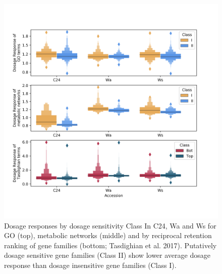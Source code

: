\documentclass[11pt]{article}
\begin{document}
\begin{figure}[h!]
    \includegraphics[width=\linewidth]{../figures/all_dr_boxen.png}
 \caption{Dosage responses by dosage sensitivity Class In C24, Wa and Ws for GO (top), metabolic networks (middle) and by reciprocal retention ranking of gene families (bottom; Tasdighian et al. 2017). Putatively dosage sensitive gene families (Class II) show lower average dosage response than dosage insensitive gene families (Class I).}
  \label{fig4}
\end{figure}
\end{document}
